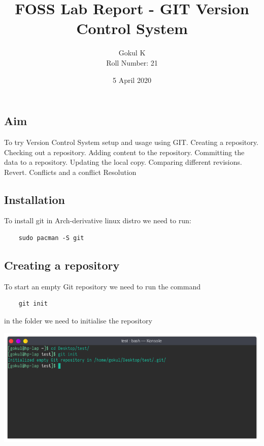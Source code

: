 \documentclass{article}
\begin{document}
\title{FOSS Lab Report - GIT Version Control System}
\author{Gokul K\\[2\baselineskip]
Roll Number: 21\\[2\baselineskip]}
\date{5 April 2020}

\maketitle

\newpage

\tableofcontents

\newpage

\setcounter{section}{27}
\subsection{Aim}
To try Version Control System setup and usage using GIT. Creating a repository. Checking out a repository. Adding content to the repository. Committing the data to a repository. Updating the local copy. Comparing different revisions. Revert. Conflicts and a conflict Resolution\newline
\newpage

\subsection{Installation}
To install git in Arch-derivative linux distro we need to run:
\begin{verbatim}
	sudo pacman -S git
\end{verbatim}
\newpage

\subsection{Creating a repository}
To start an empty Git repository we need to run the command
\begin{verbatim}
	git init
\end{verbatim}
in the folder we need to initialise the repository
\newline

\includegraphics[width=1.2\textwidth]{img/p27/ss1.png}
\end{document}
